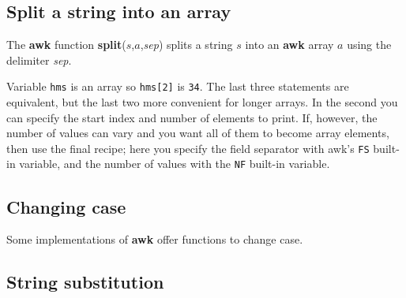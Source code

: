 \documentclass[twoside,11pt,nolof]{starlink}
\begin{document}
\subsection{Split a string into an
array\label{sc4_se_string_split}}

The \textbf{awk} function \textbf{split}($s$,$a$,\emph{sep}) splits a string
$s$ into an \textbf{awk} array $a$ using the delimiter \emph{sep}.

\begin{small}
\end{small}
Variable \texttt{hms} is an array so \texttt{hms[2]} is \texttt{34}.
The last three statements are equivalent, but the last two more
convenient for longer arrays.  In the second you can specify the start
index and number of elements to print.  If, however, the number of
values can vary and you want all of them to become array elements,
then use the final recipe; here you specify the field separator with
awk's \texttt{FS} built-in variable, and the number of values with the
\texttt{NF} built-in variable.

\subsection{Changing case
\label{sc4_se_string_case}}

Some implementations of \textbf{awk} offer functions to change case.

\begin{small}
\end{small}


\subsection{String substitution
\label{sc4_se_string_sub}}
\end{document}
